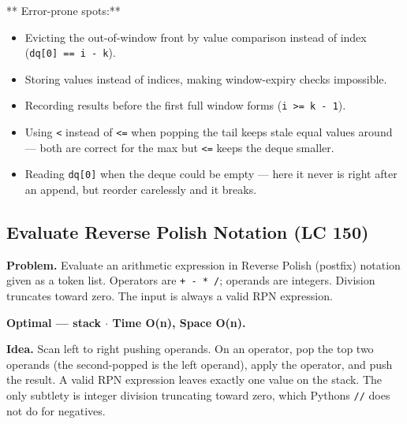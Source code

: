 \documentclass[11pt]{article}
\providecommand{\tightlist}{\setlength{\itemsep}{1pt}\setlength{\parskip}{0pt}}
\begin{document}
** Error-prone spots:**

\begin{itemize}
\tightlist
\item
  Evicting the out-of-window front by value comparison instead of index (\texttt{dq{[}0{]}\ ==\ i\ -\ k}).
\item
  Storing values instead of indices, making window-expiry checks impossible.
\item
  Recording results before the first full window forms (\texttt{i\ \textgreater{}=\ k\ -\ 1}).
\item
  Using \texttt{\textless{}} instead of \texttt{\textless{}=} when popping the tail keeps stale equal values around --- both are correct for the max but \texttt{\textless{}=} keeps the deque smaller.
\item
  Reading \texttt{dq{[}0{]}} when the deque could be empty --- here it never is right after an append, but reorder carelessly and it breaks.
\end{itemize}

\subsection{Evaluate Reverse Polish Notation (LC 150)}\label{evaluate-reverse-polish-notation-lc-150}

\textbf{Problem.} Evaluate an arithmetic expression in Reverse Polish (postfix) notation given as a token list. Operators are \texttt{+\ -\ *\ /}; operands are integers. Division truncates toward zero. The input is always a valid RPN expression.

\textbf{Optimal --- stack \(\cdot\) Time O(n), Space O(n).}

\textbf{Idea.} Scan left to right pushing operands. On an operator, pop the top two operands (the second-popped is the left operand), apply the operator, and push the result. A valid RPN expression leaves exactly one value on the stack. The only subtlety is integer division truncating toward zero, which Python\textquotesingle s \texttt{//} does not do for negatives.

\end{document}
